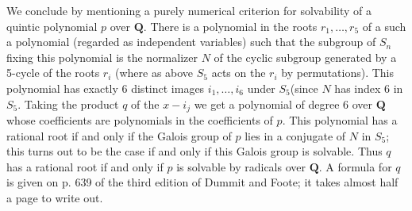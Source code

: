 \documentclass[10pt]{article}
\begin{document}
We conclude by mentioning a purely numerical criterion for solvability
of a quintic polynomial $p$ over $\mathbf Q$. There is a polynomial in
the roots $r_1,\ldots,r_5$ of a such a polynomial (regarded as
independent variables) such that the subgroup of $S_n$ fixing this
polynomial is the normalizer $N$ of the cyclic subgroup generated by a
5-cycle of the roots $r_i$ (where as above $S_5$ acts on the $r_i$ by
permutations). This polynomial has exactly 6 distinct images
$i_1,\ldots,i_6$ under $S_5$(since $N$ has index 6 in $S_5$. Taking the
product $q$ of the $x-i_j$ we get a polynomial of degree 6 over $\mathbf
Q$ whose coefficients are polynomials in the coefficients of $p$. This
polynomial has a rational root if and only if the Galois group of $p$
lies in a conjugate of $N$ in $S_5$; this turns out to be the case if
and only if this Galois group is solvable. Thus $q$ has a rational root
if and only if $p$ is solvable by radicals over $\mathbf Q$. A formula
for $q$ is given on p. 639 of the third edition of Dummit and Foote; it
takes almost half a page to write out.
\end{document}
